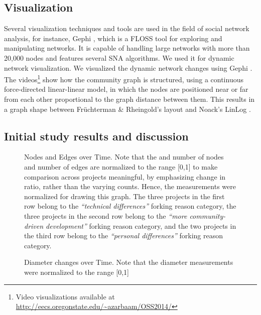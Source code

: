 \documentclass{acm_proc_article-sp}
\begin{document}
\subsection{Visualization}
Several visualization techniques and tools are used in the field of social network analysis, for instance, Gephi \cite{Bastian}, which is a FLOSS tool for exploring and manipulating networks. It is capable of handling large networks with more than 20,000 nodes and features several SNA algorithms. We used it for dynamic network visualization.
We visualized the dynamic network changes using Gephi \cite{Bastian}. The videos\footnote{\label{footnote1}Video visualizations available at \href{http://eecs.oregonstate.edu/~azarbaam/OSS2014/}{http://eecs.oregonstate.edu/\textasciitilde azarbaam/OSS2014/}} show how the community graph is structured, using a continuous force-directed linear-linear model, in which the nodes are positioned near or far from each other proportional to the graph distance between them. This results in a graph shape between Fr\"{u}chterman \& Rheingold's \cite{Fruchterman} layout and Noack's LinLog \cite{Noack}.


\subsection{Initial study results and discussion}
\label{results}

\begin{figure}[!Ht]
\centering
{}
\caption{Nodes and Edges over Time. Note that the and number of nodes and number of edges are normalized to the range [0,1] to make comparison across projects meaningful, by emphasizing change in ratio, rather than the varying counts. Hence, the measurements were normalized for drawing this graph. The three projects in the first row belong to the \textit{``technical differences''} forking reason category, the three projects in the second row belong to the \textit{``more community-driven development''} forking reason category, and the two projects in the third row belong to the \textit{``personal differences''} forking reason category.}
\label{figureNodesEdgesTimeR}
\end{figure}

\begin{figure}[!Ht]
\centering
{}
\caption{Diameter changes over Time. Note that the diameter measurements were normalized to the range [0,1]}
\label{figureDiameterTimeR}
\end{figure}
\end{document}
